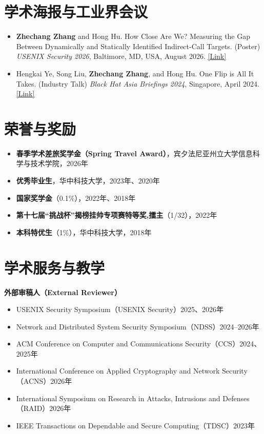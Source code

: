 \documentclass[UTF8,zihao=5,fontset=fandol,letterpaper]{ctexart}
\newcommand{\cvlink}[2]{\href{#1}{\underline{#2}}}
\begin{document}
\newpage
\section{学术海报与工业界会议}

\begin{itemize}
  \raggedright
  \item \textbf{Zhechang Zhang} and Hong Hu.
    How Close Are We? Measuring the Gap Between Dynamically and Statically Identified Indirect-Call Targets.
    (Poster) \textit{USENIX Security 2026}, Baltimore, MD, USA, August 2026.
    \cvlink{https://www.usenix.org/conference/usenixsecurity26/poster-session}{[Link]}
  \item Hengkai Ye, Song Liu, \textbf{Zhechang Zhang}, and Hong Hu.
    One Flip is All It Takes.
    (Industry Talk) \textit{Black Hat Asia Briefings 2024}, Singapore, April 2024.
    \cvlink{https://www.blackhat.com/asia-24/briefings/schedule/index.html\#one-flip-is-all-it-takes-identifying-syscall-guard-variables-for-data-only-attacks-36285}{[Link]}
\end{itemize}

\section{荣誉与奖励}

\begin{itemize}
  \item \textbf{春季学术差旅奖学金（Spring Travel Award）}，宾夕法尼亚州立大学信息科学与技术学院，2026年
  \item \textbf{优秀毕业生}，华中科技大学，2023年、2020年
  \item \textbf{国家奖学金}（0.1\%），2022年、2018年
  \item \textbf{第十七届“挑战杯”揭榜挂帅专项赛特等奖,擂主}（1/32），2022年
  \item \textbf{本科特优生}（1\%），华中科技大学，2018年
\end{itemize}

\section{学术服务与教学}

\textbf{外部审稿人（External Reviewer）}
\begin{itemize}
  \item USENIX Security Symposium（USENIX Security）\hfill 2025、2026年
  \item Network and Distributed System Security Symposium（NDSS）\hfill 2024--2026年
  \item ACM Conference on Computer and Communications Security（CCS）\hfill 2024、2025年
  \item International Conference on Applied Cryptography and Network Security（ACNS）\hfill 2026年
  \item International Symposium on Research in Attacks, Intrusions and Defenses（RAID）\hfill 2026年
  \item IEEE Transactions on Dependable and Secure Computing（TDSC）\hfill 2023年
\end{itemize}
\end{document}
